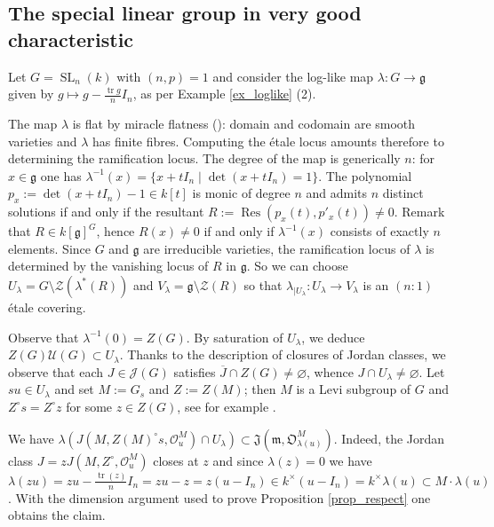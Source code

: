 \documentclass[12pt]{amsart}
\theoremstyle{definition}
\theoremstyle{remark}
\newcommand{\g}{\mathfrak{g}}
\newcommand{\m}{\mathfrak{m}}
\newcommand{\J}{\mathfrak{J}}
\newcommand{\orb}{\mathfrak{O}}
\renewcommand{\O}{\mathcal{O}}
\newcommand{\tr}{\operatorname{tr}}
\newcommand{\SL}{\operatorname{SL}}
\newcommand{\Res}{\operatorname{Res}}
\begin{document}
\subsection{The special linear group in very good characteristic} \label{sub_SLn}
Let $G = \SL_n(k)$ with $(n,p) = 1$  and consider the log-like map $\lambda \colon G  \to \g$ given by $g \mapsto g - \frac{\tr g}{n}I_n$, as per Example \ref{ex_loglike} (2).

The map $\lambda$ is flat by miracle flatness (\cite[Theorem 23.1]{Matsumura}): domain and codomain are smooth varieties and $\lambda$ has finite fibres.
Computing the \'etale locus amounts therefore to determining the ramification locus.
The degree of the map is generically $n$: for $x \in \g$ one has $\lambda^{-1}(x) = \{ x + t I_n \mid \det(x + t I_n) = 1\}$.
The polynomial $p_x := \det(x + t I_n) - 1 \in k[t]$ is monic of degree $n$ and admits $n$ distinct solutions if and only if the resultant $R := \Res(p_x(t), p'_x(t)) \neq 0$.
Remark that $R \in k[\g]^G$,
hence $R(x) \neq 0$ if and only if $\lambda^{-1}(x)$ consists of exactly $n$ elements.
Since $G$ and $\g$ are irreducible varieties, the ramification locus of $\lambda$ is determined by the vanishing locus of $R$ in $\g$.
So we can choose $U_\lambda = G \setminus \mathcal{Z}(\lambda^*(R))$ and $V_\lambda = \g \setminus \mathcal{Z}(R)$ so that $\lambda_{\mid U_\lambda} \colon U_\lambda \to V_\lambda$ is an $(n:1)$ \'etale covering.

Observe that $\lambda^{-1}(0) = Z(G)$.
By saturation of $U_\lambda$, we deduce $Z(G) \mathcal{U}(G) \subset U_\lambda$.
Thanks to the description of closures of Jordan classes, we observe that each $J \in \mathcal{J}(G)$ satisfies $\overline{J} \cap Z(G) \neq \varnothing$, whence  $J \cap U_\lambda \neq \varnothing$.
Let $su \in U_\lambda$ and set $M := G_s$ and $Z := Z(M)$; then $M$ is a Levi subgroup of $G$ and $Z^\circ s = Z^\circ z$ for some $z \in Z(G)$, see for example \cite[Remark 3.7]{AC}.

We have $\lambda(J(M, Z(M)^\circ s, \O^M_u) \cap U_\lambda)  \subset \J(\m, \orb^M_{\lambda(u)})$.
Indeed, the Jordan class $J = z J(M, Z^\circ, \O^M_u)$ closes at $z$ and
since $\lambda(z) = 0$ we have $\lambda(zu) = zu - \frac{\tr(z)}{n} I_n = zu - z = z(u-I_n) \in k^\times (u-I_n) = k^\times \lambda(u) \subset M \cdot \lambda(u)$.
With the  dimension argument used to prove Proposition 
\ref{prop_respect} one obtains the claim.
\end{document}
